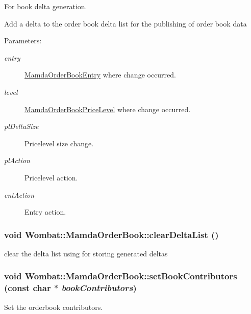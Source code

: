 For book delta generation. 

Add a delta to the order book delta list for the publishing of order book data \begin{Desc}
\item[Parameters:]
\begin{description}
\item[{\em entry}]\hyperlink{classWombat_1_1MamdaOrderBookEntry}{Mamda\-Order\-Book\-Entry} where change occurred. \item[{\em level}]\hyperlink{classWombat_1_1MamdaOrderBookPriceLevel}{Mamda\-Order\-Book\-Price\-Level} where change occurred. \item[{\em pl\-Delta\-Size}]Pricelevel size change. \item[{\em pl\-Action}]Pricelevel action. \item[{\em ent\-Action}]Entry action. \end{description}
\end{Desc}
\hypertarget{classWombat_1_1MamdaOrderBook_5731f25e5419db8a45b16b34cc04480d}{
\subsubsection[clearDeltaList]{\setlength{\rightskip}{0pt plus 5cm}void Wombat::Mamda\-Order\-Book::clear\-Delta\-List ()}}
\label{classWombat_1_1MamdaOrderBook_5731f25e5419db8a45b16b34cc04480d}


clear the delta list using for storing generated deltas 

\hypertarget{classWombat_1_1MamdaOrderBook_1497ba3b8e8d9ad10e8329cf8eb5ad57}{
\subsubsection[setBookContributors]{\setlength{\rightskip}{0pt plus 5cm}void Wombat::Mamda\-Order\-Book::set\-Book\-Contributors (const char $\ast$ {\em book\-Contributors})}}
\label{classWombat_1_1MamdaOrderBook_1497ba3b8e8d9ad10e8329cf8eb5ad57}


Set the orderbook contributors. 

